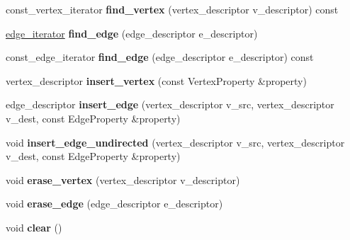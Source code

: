 \begin{DoxyCompactItemize}
\item 
\hypertarget{classmystl_1_1graph_a7870e4532e14ceadfd59838e6c4dcd0c}{const\+\_\+vertex\+\_\+iterator {\bfseries find\+\_\+vertex} (vertex\+\_\+descriptor v\+\_\+descriptor) const }\label{classmystl_1_1graph_a7870e4532e14ceadfd59838e6c4dcd0c}

\item 
\hypertarget{classmystl_1_1graph_ab62c660d618a35dd79ad7d2e5296a6c6}{\hyperlink{classmystl_1_1graph_aca4e86526b9606bc4a568b0c4e127b3f}{edge\+\_\+iterator} {\bfseries find\+\_\+edge} (edge\+\_\+descriptor e\+\_\+descriptor)}\label{classmystl_1_1graph_ab62c660d618a35dd79ad7d2e5296a6c6}

\item 
\hypertarget{classmystl_1_1graph_ab248f0d7d62bd50d6a80746d3cf63fb1}{const\+\_\+edge\+\_\+iterator {\bfseries find\+\_\+edge} (edge\+\_\+descriptor e\+\_\+descriptor) const }\label{classmystl_1_1graph_ab248f0d7d62bd50d6a80746d3cf63fb1}

\item 
\hypertarget{classmystl_1_1graph_a113159cdbf74506664abc3a80c317965}{vertex\+\_\+descriptor {\bfseries insert\+\_\+vertex} (const Vertex\+Property \&property)}\label{classmystl_1_1graph_a113159cdbf74506664abc3a80c317965}

\item 
\hypertarget{classmystl_1_1graph_aa4dfab685cad6afd7e8844dce5677503}{edge\+\_\+descriptor {\bfseries insert\+\_\+edge} (vertex\+\_\+descriptor v\+\_\+src, vertex\+\_\+descriptor v\+\_\+dest, const Edge\+Property \&property)}\label{classmystl_1_1graph_aa4dfab685cad6afd7e8844dce5677503}

\item 
\hypertarget{classmystl_1_1graph_a4d25045a4836e8f45e96963825a5473e}{void {\bfseries insert\+\_\+edge\+\_\+undirected} (vertex\+\_\+descriptor v\+\_\+src, vertex\+\_\+descriptor v\+\_\+dest, const Edge\+Property \&property)}\label{classmystl_1_1graph_a4d25045a4836e8f45e96963825a5473e}

\item 
\hypertarget{classmystl_1_1graph_a744d4aadf26398d64c4a162e8a5a47b0}{void {\bfseries erase\+\_\+vertex} (vertex\+\_\+descriptor v\+\_\+descriptor)}\label{classmystl_1_1graph_a744d4aadf26398d64c4a162e8a5a47b0}

\item 
\hypertarget{classmystl_1_1graph_a476bcdd8e98edf1f53db62a20f50747e}{void {\bfseries erase\+\_\+edge} (edge\+\_\+descriptor e\+\_\+descriptor)}\label{classmystl_1_1graph_a476bcdd8e98edf1f53db62a20f50747e}

\item 
\hypertarget{classmystl_1_1graph_ab7e28ce8dedb8b396c8912b6aacf263d}{void {\bfseries clear} ()}\label{classmystl_1_1graph_ab7e28ce8dedb8b396c8912b6aacf263d}

\end{DoxyCompactItemize}
